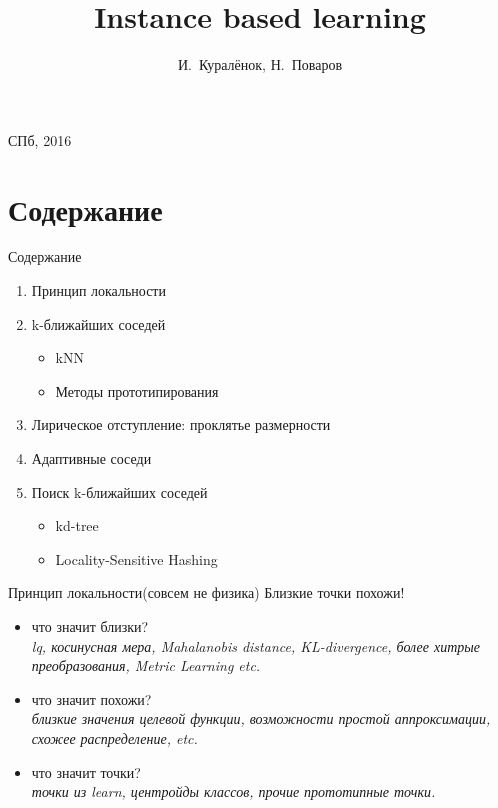 \documentclass[14pt, fleqn, xcolor={dvipsnames, table}]{beamer}
\title{Instance based learning\\\small{}}
\author[]{\small{%
И.~Куралёнок,
Н.~Поваров}}
\date{}
\begin{document}
\begin{frame}
\maketitle
\small
\begin{center}
\vspace{-60pt}
\vspace{80pt}
\footnotesize СПб, 2016
\end{center}
\end{frame}

\section{Содержание}
\begin{frame}{Содержание}
\begin{enumerate}
  \item Принцип локальности
  \item k-ближайших соседей
  \begin{itemize}
    \item kNN
    \item Методы прототипирования
  \end{itemize}
  \item Лирическое отступление: проклятье размерности
  \item Адаптивные соседи
  \item Поиск k-ближайших соседей
  \begin{itemize}
    \item kd-tree
    \item Locality-Sensitive Hashing
  \end{itemize}
\end{enumerate}
\end{frame}

\begin{frame}{Принцип локальности(совсем не физика)}
  Близкие точки похожи!
  \begin{itemize}
    \item что значит близки? \\
    \emph{lq, косинусная мера, Mahalanobis distance, KL-divergence, более хитрые преобразования, Metric Learning etc.}
    \item что значит похожи? \\
    \emph{близкие значения целевой функции, возможности простой аппроксимации, схожее распределение, etc.}
    \item что значит точки? \\
    \emph{точки из learn, центройды классов, прочие прототипные точки.}
  \end{itemize}
\end{frame}
\end{document}
